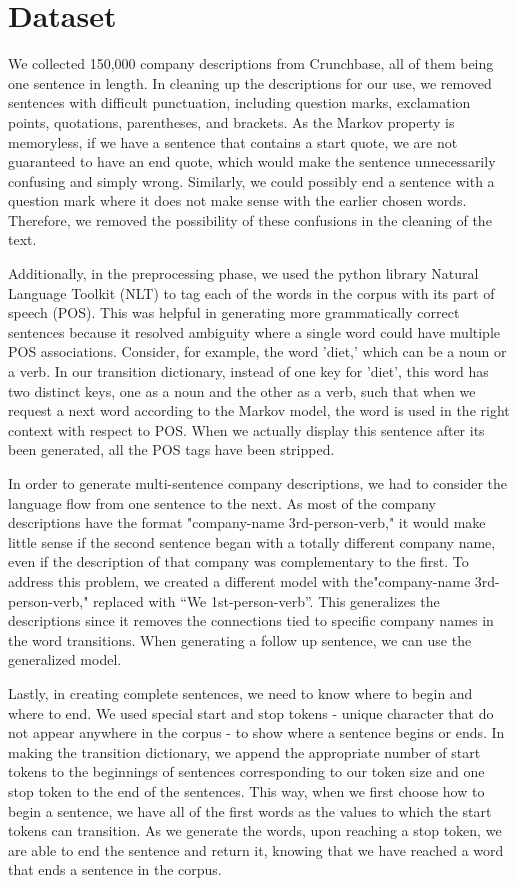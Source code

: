 \documentclass[11pt]{article}
\begin{document}
\section{Dataset}


We collected 150,000 company descriptions from Crunchbase, all of them being one sentence in length. In cleaning up the descriptions for our use, we removed sentences with difficult punctuation, including question marks, exclamation points, quotations, parentheses, and brackets. As the Markov property is memoryless, if we have a sentence that contains a start quote, we are not guaranteed to have an end quote, which would make the sentence unnecessarily confusing and simply wrong. Similarly, we could possibly end a sentence with a question mark where it does not make sense with the earlier chosen words. Therefore, we removed the possibility of these confusions in the cleaning of the text.

Additionally, in the preprocessing phase, we used the python library Natural Language Toolkit (NLT) to tag each of the words in the corpus with its part of speech (POS). This was helpful in generating more grammatically correct sentences because it resolved ambiguity where a single word could have multiple POS associations. Consider, for example, the word 'diet,' which can be a noun or a verb. In our transition dictionary, instead of one key for 'diet', this word has two distinct keys, one as a noun and the other as a verb, such that when we request a next word according to the Markov model, the word is used in the right context with respect to POS. When we actually display this sentence after its been generated, all the POS tags have been stripped. 

In order to generate multi-sentence company descriptions, we had to consider the language flow from one sentence to the next. As most of the company descriptions have the format "company-name 3rd-person-verb," it would make little sense if the second sentence began with a totally different company name, even if the description of that company was complementary to the first. To address this problem, we created a different model with the"company-name 3rd-person-verb," replaced with ``We 1st-person-verb''. This generalizes the descriptions since it removes the connections tied to specific company names in the word transitions. When generating a follow up sentence, we can use the generalized model.

Lastly, in creating complete sentences, we need to know where to begin and where to end. We used special start and stop tokens - unique character that do not appear anywhere in the corpus - to show where a sentence begins or ends. In making the transition dictionary, we append the appropriate number of start tokens to the beginnings of sentences corresponding to our token size and one stop token to the end of the sentences. This way, when we first choose how to begin a sentence, we have all of the first words as the values to which the start tokens can transition. As we generate the words, upon reaching a stop token, we are able to end the sentence and return it, knowing that we have reached a word that ends a sentence in the corpus.
\end{document}
